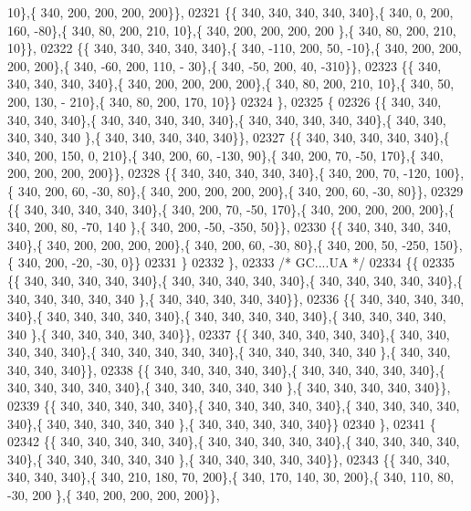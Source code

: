 \begin{DoxyCode}
      10\},\{ 340, 200, 200, 200, 200\}\},
02321 \{\{ 340, 340, 340, 340, 340\},\{ 340,   0, 200, 160, -80\},\{ 340,  80, 200, 210,  10\},\{ 340, 200, 200, 200, 200
      \},\{ 340,  80, 200, 210,  10\}\},
02322 \{\{ 340, 340, 340, 340, 340\},\{ 340, -110, 200,  50, -10\},\{ 340, 200, 200, 200, 200\},\{ 340, -60, 200, 110, -
      30\},\{ 340, -50, 200,  40, -310\}\},
02323 \{\{ 340, 340, 340, 340, 340\},\{ 340, 200, 200, 200, 200\},\{ 340,  80, 200, 210,  10\},\{ 340,  50, 200, 130, -
      210\},\{ 340,  80, 200, 170,  10\}\}
02324 \},
02325 \{
02326 \{\{ 340, 340, 340, 340, 340\},\{ 340, 340, 340, 340, 340\},\{ 340, 340, 340, 340, 340\},\{ 340, 340, 340, 340, 340
      \},\{ 340, 340, 340, 340, 340\}\},
02327 \{\{ 340, 340, 340, 340, 340\},\{ 340, 200, 150,   0, 210\},\{ 340, 200,  60, -130,  90\},\{ 340, 200,  70, -50, 
      170\},\{ 340, 200, 200, 200, 200\}\},
02328 \{\{ 340, 340, 340, 340, 340\},\{ 340, 200,  70, -120, 100\},\{ 340, 200,  60, -30,  80\},\{ 340, 200, 200, 200, 
      200\},\{ 340, 200,  60, -30,  80\}\},
02329 \{\{ 340, 340, 340, 340, 340\},\{ 340, 200,  70, -50, 170\},\{ 340, 200, 200, 200, 200\},\{ 340, 200,  80, -70, 140
      \},\{ 340, 200, -50, -350,  50\}\},
02330 \{\{ 340, 340, 340, 340, 340\},\{ 340, 200, 200, 200, 200\},\{ 340, 200,  60, -30,  80\},\{ 340, 200,  50, -250, 
      150\},\{ 340, 200, -20, -30,   0\}\}
02331 \}
02332 \},
02333 \textcolor{comment}{/* GC....UA */}
02334 \{\{
02335 \{\{ 340, 340, 340, 340, 340\},\{ 340, 340, 340, 340, 340\},\{ 340, 340, 340, 340, 340\},\{ 340, 340, 340, 340, 340
      \},\{ 340, 340, 340, 340, 340\}\},
02336 \{\{ 340, 340, 340, 340, 340\},\{ 340, 340, 340, 340, 340\},\{ 340, 340, 340, 340, 340\},\{ 340, 340, 340, 340, 340
      \},\{ 340, 340, 340, 340, 340\}\},
02337 \{\{ 340, 340, 340, 340, 340\},\{ 340, 340, 340, 340, 340\},\{ 340, 340, 340, 340, 340\},\{ 340, 340, 340, 340, 340
      \},\{ 340, 340, 340, 340, 340\}\},
02338 \{\{ 340, 340, 340, 340, 340\},\{ 340, 340, 340, 340, 340\},\{ 340, 340, 340, 340, 340\},\{ 340, 340, 340, 340, 340
      \},\{ 340, 340, 340, 340, 340\}\},
02339 \{\{ 340, 340, 340, 340, 340\},\{ 340, 340, 340, 340, 340\},\{ 340, 340, 340, 340, 340\},\{ 340, 340, 340, 340, 340
      \},\{ 340, 340, 340, 340, 340\}\}
02340 \},
02341 \{
02342 \{\{ 340, 340, 340, 340, 340\},\{ 340, 340, 340, 340, 340\},\{ 340, 340, 340, 340, 340\},\{ 340, 340, 340, 340, 340
      \},\{ 340, 340, 340, 340, 340\}\},
02343 \{\{ 340, 340, 340, 340, 340\},\{ 340, 210, 180,  70, 200\},\{ 340, 170, 140,  30, 200\},\{ 340, 110,  80, -30, 200
      \},\{ 340, 200, 200, 200, 200\}\},

\end{DoxyCode}
